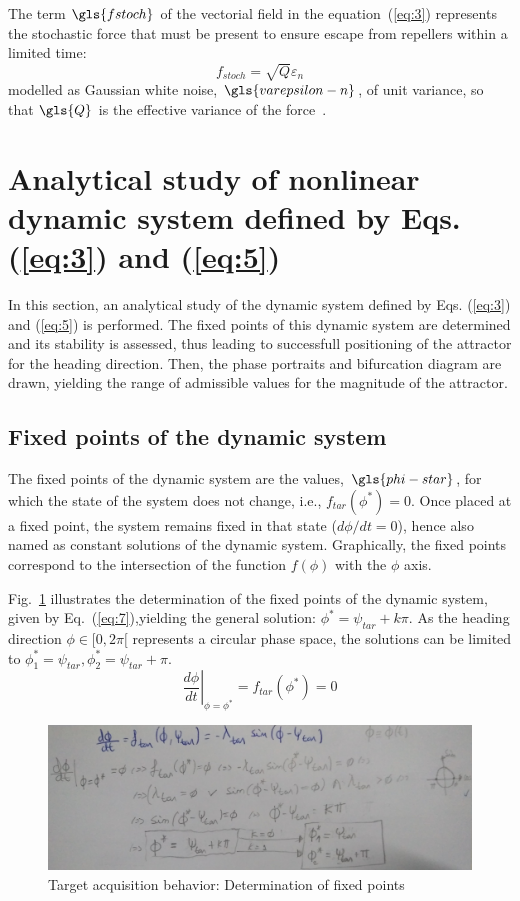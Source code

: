 The term $\gls{fstoch}$ of the vectorial field in the equation~(\ref{eq:3})
represents the stochastic force that must be present to ensure escape from
repellers within a limited time:
\begin{equation}
  \label{eq:6}
f_{stoch} = \sqrt{Q} \varepsilon _{n}
\end{equation}
modelled as Gaussian white noise, $\gls{varepsilon-n}$, of unit variance, so that
$\gls{Q}$ is the effective variance of the force~\cite{bicho2000dynamic}.

\section{Analytical study of nonlinear dynamic system defined by
  Eqs. (\ref{eq:3}) and (\ref{eq:5})}%
\label{sec:analyt-study-tar-nonl}
In this section, an analytical study of the dynamic system defined by
Eqs. (\ref{eq:3}) and (\ref{eq:5}) is performed. The fixed points of this
dynamic system are determined and its stability is assessed, thus leading to
successfull positioning of the attractor for the heading direction. Then, the phase
portraits and bifurcation diagram are drawn, yielding the range of admissible
values for the magnitude of the attractor.

\subsection{Fixed points of the dynamic system}%
\label{sec:fixed-points-dynamic}
The fixed points of the dynamic system are the values, $\gls{phi-star}$, for which the
state of the system does not change, i.e., $f_{tar}(\phi^*) = 0$. Once placed at
a fixed point, the system remains fixed in that state ($d \phi / dt = 0$), hence
also named as constant solutions of the dynamic system. Graphically, the fixed
points correspond to the intersection of the function $f(\phi)$ with the $\phi$
axis.

Fig.~\ref{fig:1-1-fixed-points} illustrates the determination of the fixed
points of the dynamic system, given by Eq.~(\ref{eq:7}),yielding the general solution:
$\phi^* = \psi_{tar} + k \pi$. As the heading direction $\phi \in [0, 2 \pi[$
represents a circular phase space, the solutions can be limited to $\phi_1^* =
\psi_{tar}, \phi_2^* = \psi_{tar} + \pi$.
\begin{equation}
  \label{eq:7}
  \left. \frac{d \phi}{dt}\right|_{\phi = \phi^*} = f_{tar}(\phi^*) = 0
\end{equation}
\begin{figure}[!hbt]
\centering
    \includegraphics[width=1.0\textwidth]{./img/1-1-fixed-points.jpg}
  \caption{Target acquisition behavior: Determination of fixed points}%
\label{fig:1-1-fixed-points}
\end{figure}
% 
